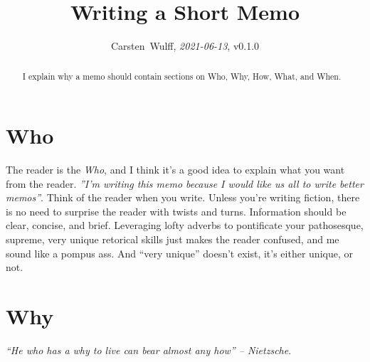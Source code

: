\documentclass[technote,10pt,a4paper]{IEEEtran}
\begin{document}

\title{Writing a Short Memo}
\author{Carsten~Wulff, \textit{2021-06-13}, v0.1.0 }
\maketitle

\begin{abstract}

  I explain why a memo should contain sections on Who, Why, How, What, and When.
\end{abstract}

\section{Who}
The reader is the \textit{Who}, and I think it's a good idea to explain what you
want from the reader.
\textit{''I'm writing this memo because I would like us all to write better memos''}.
Think of the reader when you write. Unless you're writing fiction, there is no
need to surprise the reader with twists and turns. Information should be
clear, concise, and brief. Leveraging lofty adverbs to
pontificate your pathosesque, supreme, very unique retorical skills just makes the
reader confused, and me sound like a pompus ass. And ``very unique'' doesn't
exist, it's either unique, or not.


\section{Why}
\textit{“He who has a why to live can bear almost any how” -- Nietzsche}.
\end{document}
